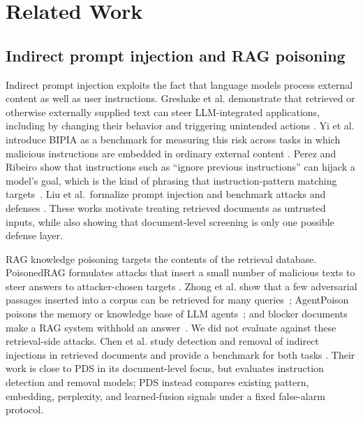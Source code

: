 \section{Related Work}

\subsection{Indirect prompt injection and RAG poisoning}
Indirect prompt injection exploits the fact that language models process
external content as well as user instructions. Greshake et al. demonstrate
that retrieved or otherwise externally supplied text can steer
LLM-integrated applications, including by changing their behavior and
triggering unintended actions \cite{greshake2023indirect}. Yi et al.
introduce BIPIA as a benchmark for measuring this risk across tasks in which
malicious instructions are embedded in ordinary external content
\cite{yi2023benchmarking}. Perez and Ribeiro show that instructions such as
``ignore previous instructions'' can hijack a model's goal, which is the kind
of phrasing that instruction-pattern matching targets~\cite{perez2022ignore}.
Liu et al.\ formalize prompt injection and benchmark attacks and defenses
\cite{liu2024formalizing}. These works motivate
treating retrieved documents as untrusted inputs, while also showing that
document-level screening is only one possible defense layer.

RAG knowledge poisoning targets the contents of the retrieval database.
PoisonedRAG formulates attacks that insert a small number of malicious texts
to steer answers to attacker-chosen targets \cite{zou2024poisonedrag}. Zhong
et al. show that a few adversarial passages inserted into a corpus can be
retrieved for many queries~\cite{zhong2023poisoning}; AgentPoison poisons the
memory or knowledge base of LLM agents~\cite{chen2024agentpoison}; and blocker
documents make a RAG system withhold an answer~\cite{shafran2025jamming}. We did
not evaluate against these retrieval-side attacks. Chen
et al. study detection and removal of indirect injections in retrieved
documents and provide a benchmark for both tasks \cite{chen2025detectremove}.
Their work is close to PDS in its document-level focus, but evaluates
instruction detection and removal models; PDS instead compares existing
pattern, embedding, perplexity, and learned-fusion signals under a fixed
false-alarm protocol.

